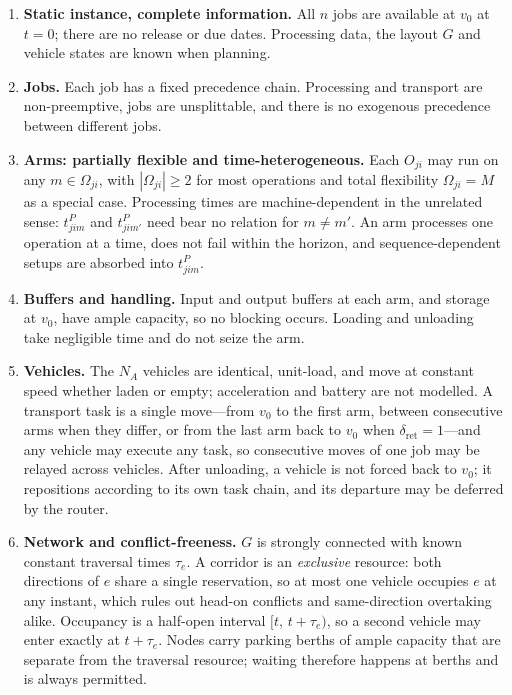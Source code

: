 \documentclass[manuscript,screen,review]{acmart}
\begin{document}
\begin{enumerate}[label=\textbf{A\arabic*.},leftmargin=*,topsep=2pt,itemsep=2pt]
\item \textbf{Static instance, complete information.} All $n$ jobs are available
at $v_0$ at $t=0$; there are no release or due dates. Processing data, the
layout $G$ and vehicle states are known when planning.

\item \textbf{Jobs.} Each job has a fixed precedence chain. Processing and
transport are non-preemptive, jobs are unsplittable, and there is no exogenous
precedence between different jobs.

\item \textbf{Arms: partially flexible and time-heterogeneous.} Each $O_{ji}$
may run on any $m\in\Omega_{ji}$, with $|\Omega_{ji}|\ge 2$ for most operations
and total flexibility $\Omega_{ji}=M$ as a special case. Processing times are
machine-dependent in the unrelated sense: $t^P_{jim}$ and $t^P_{jim'}$ need
bear no relation for $m\neq m'$. An arm processes one operation at a time, does
not fail within the horizon, and sequence-dependent setups are absorbed into
$t^P_{jim}$.

\item \textbf{Buffers and handling.} Input and output buffers at each arm, and
storage at $v_0$, have ample capacity, so no blocking occurs. Loading and
unloading take negligible time and do not seize the arm.

\item \textbf{Vehicles.} The $N_A$ vehicles are identical, unit-load, and move
at constant speed whether laden or empty; acceleration and battery are not
modelled. A transport task is a single move---from $v_0$ to the first arm,
between consecutive arms when they differ, or from the last arm back to $v_0$
when $\delta_{\mathrm{ret}}=1$---and any vehicle may execute any task, so
consecutive moves of one job may be relayed across vehicles. After unloading, a
vehicle is not forced back to $v_0$; it repositions according to its own task
chain, and its departure may be deferred by the router.

\item \textbf{Network and conflict-freeness.} $G$ is strongly connected with
known constant traversal times $\tau_e$. A corridor is an \emph{exclusive}
resource: both directions of $e$ share a single reservation, so at most one
vehicle occupies $e$ at any instant, which rules out head-on conflicts and
same-direction overtaking alike. Occupancy is a half-open interval
$[t,\,t+\tau_e)$, so a second vehicle may enter exactly at $t+\tau_e$. Nodes
carry parking berths of ample capacity that are separate from the traversal
resource; waiting therefore happens at berths and is always permitted.


\end{enumerate}
\end{document}
